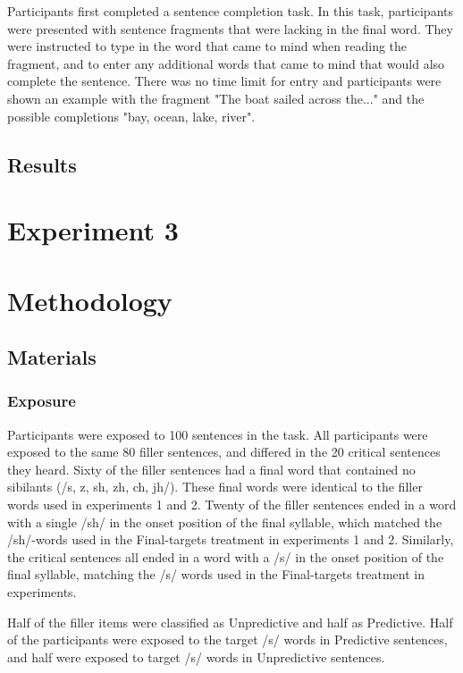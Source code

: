 Participants first completed a sentence completion task.  In this task, participants were presented with sentence fragments that were lacking in the final word.  They were instructed to type in the word that came to mind when reading the fragment, and to enter any additional words that came to mind that would also complete the sentence.  There was no time limit for entry and participants were shown an example with the fragment "The boat sailed across the..." and the possible completions "bay, ocean, lake, river".

\subsection{Results}


\section{Experiment 3}

\section{Methodology}

\subsection{Materials}

\subsubsection{Exposure}

Participants were exposed to 100 sentences in the task.  All participants were exposed to the same 80 filler sentences, and differed in the 20 critical sentences they heard.  Sixty of the filler sentences had a final word that contained no sibilants  (/s, z, sh, zh, ch, jh/).  These final words were identical to the filler words used in experiments 1 and 2.  Twenty of the filler sentences ended in a word with a single /sh/ in the onset position of the final syllable, which matched the /sh/-words used in the Final-targets treatment in experiments 1 and 2.  Similarly, the critical sentences all ended in a word with a /s/ in the onset position of the final syllable, matching the /s/ words used in the Final-targets treatment in experiments.

Half of the filler items were classified as Unpredictive and half as Predictive.  Half of the participants were exposed to the target /s/ words in Predictive sentences, and half were exposed to target /s/ words in Unpredictive sentences.  


